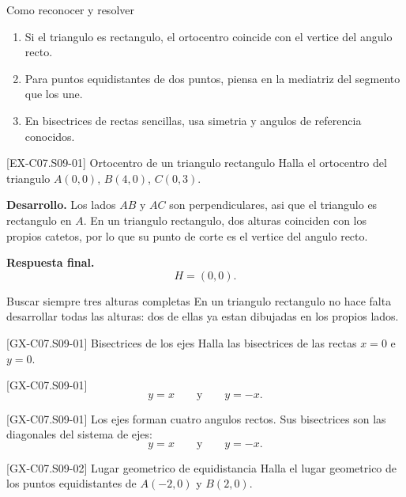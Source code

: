 \begin{methodbox}{Como reconocer y resolver}
\begin{enumerate}
  \item Si el triangulo es rectangulo, el ortocentro coincide con el vertice del angulo recto.
  \item Para puntos equidistantes de dos puntos, piensa en la mediatriz del segmento que los une.
  \item En bisectrices de rectas sencillas, usa simetria y angulos de referencia conocidos.
\end{enumerate}
\end{methodbox}

\begin{solvedexample}{[EX-C07.S09-01] Ortocentro de un triangulo rectangulo}
Halla el ortocentro del triangulo \(A(0,0)\), \(B(4,0)\), \(C(0,3)\).

\textbf{Desarrollo.} Los lados \(AB\) y \(AC\) son perpendiculares, asi que el triangulo es
rectangulo en \(A\). En un triangulo rectangulo, dos alturas coinciden con los propios catetos,
por lo que su punto de corte es el vertice del angulo recto.

\textbf{Respuesta final.}
\[
H=(0,0).
\]
\end{solvedexample}

\begin{commonerror}{Buscar siempre tres alturas completas}
En un triangulo rectangulo no hace falta desarrollar todas las alturas: dos de ellas ya estan
dibujadas en los propios lados.
\end{commonerror}

\begin{guidedexercise}{[GX-C07.S09-01] Bisectrices de los ejes}
Halla las bisectrices de las rectas \(x=0\) e \(y=0\).
\end{guidedexercise}

\begin{shortanswer}{[GX-C07.S09-01]}
\[
y=x
\qquad \text{y} \qquad
y=-x.
\]
\end{shortanswer}

\begin{fullsolution}{[GX-C07.S09-01]}
Los ejes forman cuatro angulos rectos. Sus bisectrices son las diagonales del sistema de ejes:
\[
y=x
\qquad \text{y} \qquad
y=-x.
\]
\end{fullsolution}

\begin{guidedexercise}{[GX-C07.S09-02] Lugar geometrico de equidistancia}
Halla el lugar geometrico de los puntos equidistantes de \(A(-2,0)\) y \(B(2,0)\).
\end{guidedexercise}

